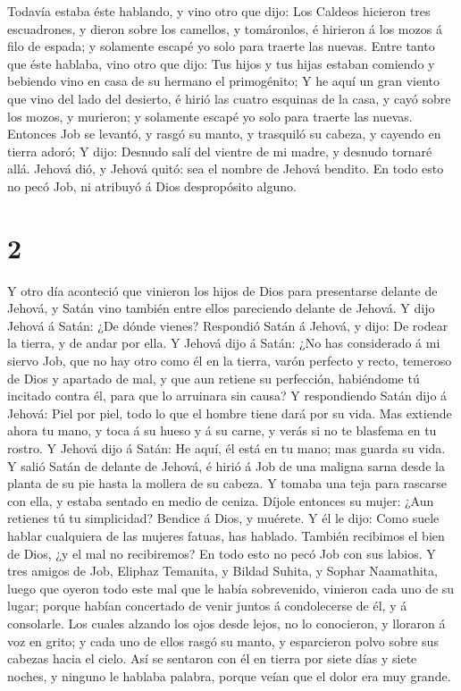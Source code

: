  Todavía estaba éste hablando, y vino otro que dijo: Los
Caldeos hicieron tres escuadrones, y dieron sobre los camellos, y
tomáronlos, é hirieron á los mozos á filo de espada; y solamente escapé
yo solo para traerte las nuevas.  Entre tanto que éste
hablaba, vino otro que dijo: Tus hijos y tus hijas estaban comiendo y
bebiendo vino en casa de su hermano el primogénito;  Y he
aquí un gran viento que vino del lado del desierto, é hirió las cuatro
esquinas de la casa, y cayó sobre los mozos, y murieron; y solamente
escapé yo solo para traerte las nuevas.  Entonces Job se
levantó, y rasgó su manto, y trasquiló su cabeza, y cayendo en tierra
adoró;  Y dijo: Desnudo salí del vientre de mi madre, y
desnudo tornaré allá. Jehová dió, y Jehová quitó: sea el nombre de
Jehová bendito.  En todo esto no pecó Job, ni atribuyó á
Dios despropósito alguno.

\hypertarget{section-1}{%
\section{2}\label{section-1}}

 Y otro día aconteció que vinieron los hijos de Dios para
presentarse delante de Jehová, y Satán vino también entre ellos
pareciendo delante de Jehová.  Y dijo Jehová á Satán: ¿De
dónde vienes? Respondió Satán á Jehová, y dijo: De rodear la tierra, y
de andar por ella.  Y Jehová dijo á Satán: ¿No has
considerado á mi siervo Job, que no hay otro como él en la tierra, varón
perfecto y recto, temeroso de Dios y apartado de mal, y que aun retiene
su perfección, habiéndome tú incitado contra él, para que lo arruinara
sin causa?  Y respondiendo Satán dijo á Jehová: Piel por
piel, todo lo que el hombre tiene dará por su vida.  Mas
extiende ahora tu mano, y toca á su hueso y á su carne, y verás si no te
blasfema en tu rostro.  Y Jehová dijo á Satán: He aquí, él
está en tu mano; mas guarda su vida.  Y salió Satán de
delante de Jehová, é hirió á Job de una maligna sarna desde la planta de
su pie hasta la mollera de su cabeza.  Y tomaba una teja
para rascarse con ella, y estaba sentado en medio de ceniza.
 Díjole entonces su mujer: ¿Aun retienes tú tu simplicidad?
Bendice á Dios, y muérete.  Y él le dijo: Como suele hablar
cualquiera de las mujeres fatuas, has hablado. También recibimos el bien
de Dios, ¿y el mal no recibiremos? En todo esto no pecó Job con sus
labios.  Y tres amigos de Job, Eliphaz Temanita, y Bildad
Suhita, y Sophar Naamathita, luego que oyeron todo este mal que le había
sobrevenido, vinieron cada uno de su lugar; porque habían concertado de
venir juntos á condolecerse de él, y á consolarle.  Los
cuales alzando los ojos desde lejos, no lo conocieron, y lloraron á voz
en grito; y cada uno de ellos rasgó su manto, y esparcieron polvo sobre
sus cabezas hacia el cielo.  Así se sentaron con él en
tierra por siete días y siete noches, y ninguno le hablaba palabra,
porque veían que el dolor era muy grande.

